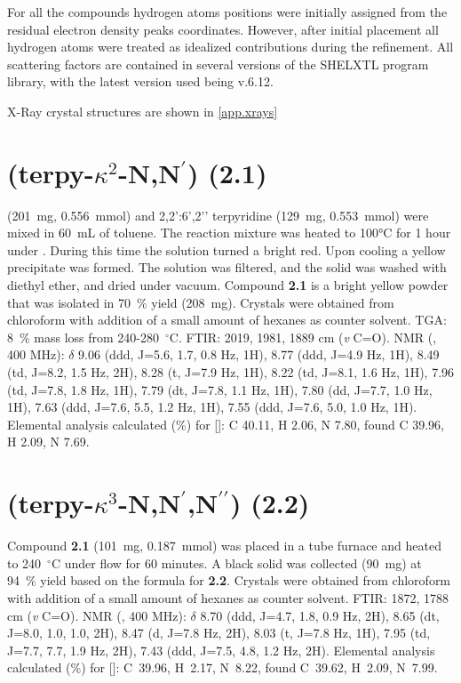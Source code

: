 For all the compounds hydrogen atoms positions were initially assigned from the residual electron density peaks coordinates. However, after initial placement all hydrogen atoms were treated as idealized contributions during the refinement. All scattering factors are contained in several versions of the SHELXTL program library, with the latest version used being v.6.12\autocite{sheldrick2008}.

X-Ray crystal structures are shown in \autoref{app.xrays}

\section{(terpy-$\kappa^2$-N,N$^\prime$) (\textbf{2.1})}\label{sec.c1}
 (201~mg,  0.556~mmol) and 2,2’:6’,2’’ terpyridine (129~mg, 0.553~mmol) were mixed in 60~mL of toluene. The reaction mixture was heated to 100°C for 1 hour under . During this time the solution turned a bright red. Upon cooling a yellow precipitate was formed. The solution was filtered, and the solid was washed with diethyl ether, and dried under vacuum. Compound \textbf{2.1} is a bright yellow powder that was isolated in 70~\% yield (208~mg). Crystals were obtained from chloroform with addition of a small amount of hexanes as counter solvent. TGA: 8~\% mass loss from 240-280~$^\circ$C.  FTIR: 2019, 1981, 1889 cm (\textit{v} C=O).  NMR (, 400 MHz): $\delta$ 9.06 (ddd, J=5.6, 1.7, 0.8 Hz, 1H), 8.77 (ddd, J=4.9 Hz, 1H), 8.49 (td, J=8.2, 1.5 Hz, 2H), 8.28 (t, J=7.9 Hz, 1H), 8.22 (td, J=8.1, 1.6 Hz, 1H), 7.96 (td, J=7.8, 1.8 Hz, 1H), 7.79 (dt, J=7.8, 1.1 Hz, 1H), 7.80 (dd, J=7.7, 1.0 Hz, 1H), 7.63 (ddd, J=7.6, 5.5, 1.2 Hz, 1H), 7.55 (ddd, J=7.6, 5.0, 1.0 Hz, 1H). Elemental analysis calculated (\%) for []: C 40.11, H 2.06, N 7.80, found C 39.96, H 2.09, N 7.69.

\section{(terpy-$\kappa^3$-N,N$^\prime$,N$^{\prime \prime}$) (\textbf{2.2})}\label{sec.c2}
Compound \textbf{2.1} (101~mg, 0.187~mmol) was placed in a tube furnace and heated to 240~$^\circ$C under  flow for 60 minutes. A black solid was collected (90~mg) at 94~\% yield based on the formula for \textbf{2.2}. Crystals were obtained from chloroform with addition of a small amount of hexanes as counter solvent. FTIR: 1872, 1788 cm (\textit{v} C=O).  NMR (, 400 MHz): $\delta$ 8.70 (ddd, J=4.7, 1.8, 0.9 Hz, 2H), 8.65 (dt, J=8.0, 1.0, 1.0, 2H), 8.47 (d, J=7.8 Hz, 2H), 8.03 (t, J=7.8 Hz, 1H), 7.95 (td, J=7.7, 7.7, 1.9 Hz, 2H), 7.43 (ddd, J=7.5, 4.8, 1.2 Hz, 2H). Elemental analysis calculated (\%) for []: C~39.96, H~2.17, N~8.22, found C~39.62, H~2.09, N~7.99.

